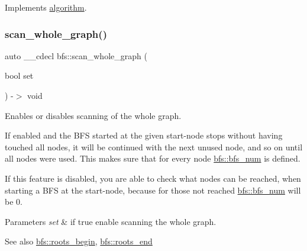 Implements \mbox{\hyperlink{classalgorithm_a482eb28cacba018b5a86d3a819a50a2f}{algorithm}}.

\mbox{\label{classbfs_ac58d930764e6aa859fe706b1d916b9ad}} 
\subsubsection{\texorpdfstring{scan\+\_\+whole\+\_\+graph()}{scan\_whole\_graph()}\hspace{0.1cm}{\footnotesize\ttfamily [1/2]}}
{\footnotesize\ttfamily auto \+\_\+\+\_\+cdecl bfs\+::scan\+\_\+whole\+\_\+graph (\begin{DoxyParamCaption}\item[{bool}]{set }\end{DoxyParamCaption}) -\/$>$ void \hspace{0.3cm}{\ttfamily [inline]}}



Enables or disables scanning of the whole graph. 

If enabled and the B\+FS started at the given start-\/node stops without having touched all nodes, it will be continued with the next unused node, and so on until all nodes were used. This makes sure that for every node \mbox{\hyperlink{classbfs_aa7e557aefbff0b1308462d9b31ae3de1}{bfs\+::bfs\+\_\+num}} is defined.

If this feature is disabled, you are able to check what nodes can be reached, when starting a B\+FS at the start-\/node, because for those not reached \mbox{\hyperlink{classbfs_aa7e557aefbff0b1308462d9b31ae3de1}{bfs\+::bfs\+\_\+num}} will be 0.


\begin{DoxyParams}{Parameters}
{\em set} & if true enable scanning the whole graph. \\
\hline
\end{DoxyParams}
\begin{DoxySeeAlso}{See also}
\mbox{\hyperlink{classbfs_a8ba1e13916302d68faafc5c5098b04fe}{bfs\+::roots\+\_\+begin}}, \mbox{\hyperlink{classbfs_ab120a4a529a9cbf407e5dcba8d33598e}{bfs\+::roots\+\_\+end}} 
\end{DoxySeeAlso}
\mbox{\label{classbfs_a558df71124787874724d67eeace62022}} 
